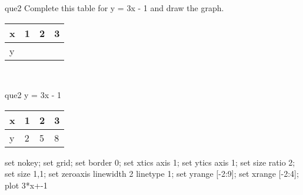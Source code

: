 \documentclass[13.5pt, varwidth=true]{beamer}
\begin{document}
\begin{frame}[shrink=19,fragile]
	\begin{beamercolorbox}[rounded=true, left, shadow=true,wd=14.8cm]{que2}
		 Complete this table for y = 3x - 1 and draw the graph. \\[0.3cm] \renewcommand{\arraystretch}{1.2}\begin{tabular}{|C|C|C|C|} \hline x & 1 & 2 & 3 \\ \hline y & & & \\ \hline \end{tabular}\\[0.3cm]
	\end{beamercolorbox}
\end{frame}
\begin{frame}[shrink=19,fragile]
	\begin{beamercolorbox}[rounded=true, left, shadow=true,wd=14.8cm]{que2}
		y = 3x - 1\renewcommand{\arraystretch}{1.2}\begin{tabular}{|C|C|C|C|} \hline x & 1 & 2 & 3 \\ \hline y & 2 & 5 & 8\\ \hline \end{tabular}\begin{gnuplot}[terminal=pdf] set nokey; set grid; set border 0; set xtics axis 1; set ytics axis 1; set size ratio 2; set size 1,1; set zeroaxis linewidth 2 linetype 1; set yrange [-2:9]; set xrange [-2:4]; plot 3*x+-1 \end{gnuplot}
	\end{beamercolorbox}
\end{frame}
\end{document}
